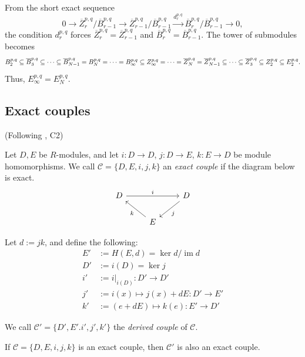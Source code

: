 \documentclass{MetricNotes2023}
\def\subq{\ensuremath\subseteq}
\DeclareMathOperator{\im}{im}
\begin{document}
From the short exact sequence 
\[0 \to \overline Z^{p,q}_{r}/\overline B_{r-1}^{p,q}\to \overline Z_{r-1}^{p,q}/\overline B_{r-1}^{p,q} \xrightarrow{d_{r}^{p,q}} \overline B_{r}^{p,q}/\overline{B}_{r-1}^{p,q}\to 0,\]
the condition \(d_r^{p,q}\) forces  \(\overline{Z}^{p,q}_r=\overline{Z}_{r-1}^{p,q}\) and \(\overline{B}^{p,q}_r=\overline{B}_{r-1}^{p,q}\). The tower of submodules becomes
\[B_2^{p,q}\subq \overline B_3^{p,q}\subq \cdots \subq \overline B_{N-1}^{p,q}=B_N^{p,q}= \cdots=B_\infty^{p,q} \subq Z_\infty^{p,q}= \cdots = \overline Z_N^{p,q}=\overline Z^{p,q}_{N-1}\subq \cdots \subq \overline Z_3^{p,q}\subq Z_2^{p,q}\subq E_2^{p,q}.\]
Thus, \(E_\infty^{p,q}=E_N^{p,q}\). 

\subsection{Exact couples}

(Following \autocite{spectral_sequences}, C2)

\begin{definition}
Let \(D, E\) be \(R\)-modules, and let \(i : D \to D\), \(j : D\to E\), \(k : E \to D\) be module homomorphisms. We call \(\mathcal{C}=\{D, E, i, j, k\}\) an \textit{exact couple} if the diagram below is exact.
\[\begin{tikzcd}
 D \arrow[rr, "i"] && D \arrow[dl, "j"] \\ 
  & E \arrow[ul, "k"] &  
 \end{tikzcd}\] 
\end{definition}

Let \(d:=jk\), and define the following:
\begin{align*}
E'&:=H(E, d)=\ker d/\im d\\
D'&:=i(D)=\ker j\\
i'&:=i|_{i(D)} : D'\to D'\\
j'&:=i(x)\mapsto j(x)+dE : D'\to E'\\
k'&:=(e+dE)\mapsto k(e) : E' \to D'
\end{align*}

We call \(\mathcal{C}'=\{D', E'. i', j', k'\}\) the \textit{derived couple} of \(\mathcal{C}\). 

\begin{proposition}
If \(\mathcal{C}=\{D, E, i, j, k\}\) is an exact couple, then \(\mathcal{C}'\) is also an exact couple.
\end{proposition}
\end{document}
